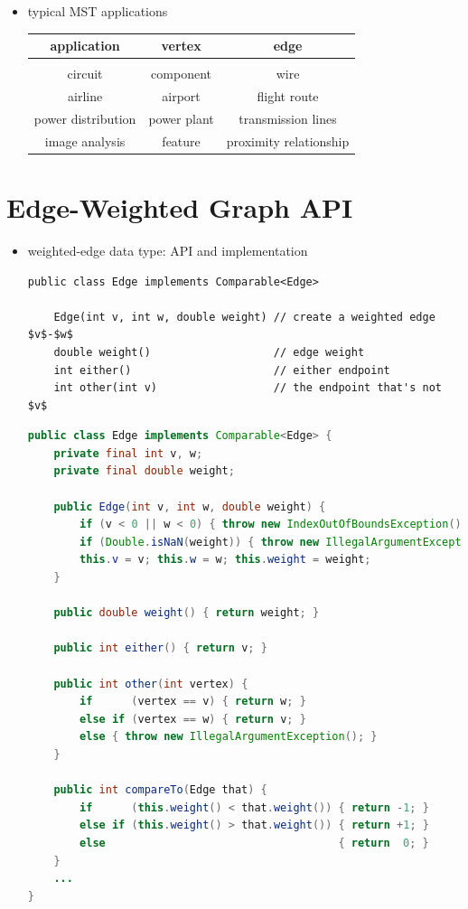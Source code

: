 \documentclass[8pt,a4paper,compress]{beamer}
\begin{document}
\begin{frame}[fragile]
\begin{itemize}
\item typical MST applications

\begin{center}
\begin{tabular}{ccc}
\textbf{application} & \textbf{vertex} & \textbf{edge} \\ \hline \\
circuit & component & wire \\
airline & airport & flight route \\
power distribution & power plant & transmission lines \\
image analysis & feature & proximity relationship
\end{tabular}
\end{center}
\end{itemize}
\end{frame}

\section{Edge-Weighted Graph API}
\begin{frame}[fragile]
\begin{itemize}
\item weighted-edge data type: API and implementation
\begin{lstlisting}[language={},mathescape]
public class Edge implements Comparable<Edge>

    Edge(int v, int w, double weight) // create a weighted edge $v$-$w$
    double weight()                   // edge weight
    int either()                      // either endpoint
    int other(int v)                  // the endpoint that's not $v$
\end{lstlisting}

\begin{lstlisting}[language=Java]
public class Edge implements Comparable<Edge> {
    private final int v, w;
    private final double weight;

    public Edge(int v, int w, double weight) {
        if (v < 0 || w < 0) { throw new IndexOutOfBoundsException(); }
        if (Double.isNaN(weight)) { throw new IllegalArgumentException(); }
        this.v = v; this.w = w; this.weight = weight;
    }

    public double weight() { return weight; }

    public int either() { return v; }

    public int other(int vertex) {
        if      (vertex == v) { return w; }
        else if (vertex == w) { return v; }
        else { throw new IllegalArgumentException(); }
    }

    public int compareTo(Edge that) {
        if      (this.weight() < that.weight()) { return -1; }
        else if (this.weight() > that.weight()) { return +1; }
        else                                    { return  0; }
    }
    ...
}
\end{lstlisting}
\end{itemize}
\end{frame}
\end{document}
